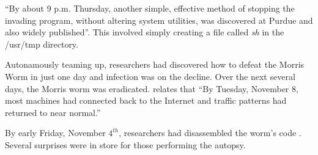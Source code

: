 ``By about 9 p.m. Thursday, another simple, effective method of stopping the
invading program, without altering system utilities, was discovered at Purdue
and also widely published''\cite{spafford_internet_1989-1}. This involved simply
creating a file called \textit{sh} in the /usr/tmp directory.

Autonamously teaming up, researchers had discovered how to defeat the Morris
Worm in just one day and infection was on the decline. Over the next several
days, the Morris worm was eradicated. \cite{spafford_internet_1989-1} relates
that ``By Tuesday, November 8, most machines had connected back to the Internet
and traffic patterns had returned to near normal.''

By early Friday, November $4^{th}$, researchers had disassembled the worm's
code 
\cite{spafford_crisis_1989}
\cite{seeley_tour_1989}.
Several surprises were in store for those performing the autopsy.
